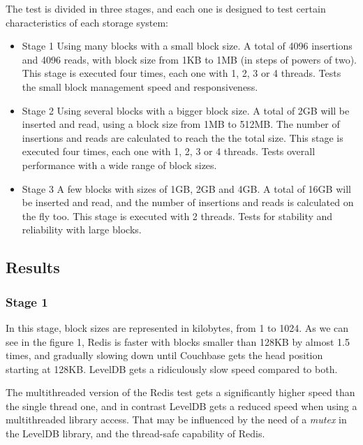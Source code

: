 \documentclass[12pt]{article}
\begin{document}
The test is divided in three stages, and each one is designed to test certain characteristics of each storage system:

\begin{itemize}
\item Stage 1
Using many blocks with a small block size. A total of 4096 insertions and 4096 reads, with block size from 1KB to 1MB (in steps of powers of two). This stage is executed four times, each one with 1, 2, 3 or 4 threads. Tests the small block management speed and responsiveness.
\item Stage 2
Using several blocks with a bigger block size. A total of 2GB will be inserted and read, using a block size from 1MB to 512MB. The number of insertions and reads are calculated to reach the the total size. This stage is executed four times, each one with 1, 2, 3 or 4 threads. Tests overall performance with a wide range of block sizes.
\item Stage 3
A few blocks with sizes of 1GB, 2GB and 4GB. A total of 16GB will be inserted and read, and the number of insertions and reads is calculated on the fly too. This stage is executed with 2 threads. Tests for stability and reliability with large blocks.
\end{itemize}

\subsection{Results}
\subsubsection{Stage 1}
In this stage, block sizes are represented in kilobytes, from 1 to 1024. As we can see in the figure 1, Redis is faster with blocks smaller than 128KB by almost 1.5 times, and gradually slowing down until Couchbase gets the head position starting at 128KB. LevelDB gets a ridiculously slow speed compared to both.

The multithreaded version of the Redis test gets a significantly higher speed than the single thread one, and in contrast LevelDB gets a reduced speed when using a multithreaded library access. That may be influenced by the need of a \textit{mutex} in the LevelDB library, and the thread-safe capability of Redis.
\end{document}
